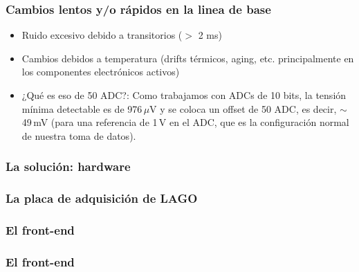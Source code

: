 \documentclass{beamer}
\begin{document}
\begin{frame}
  \frametitle{Cambios lentos y/o rápidos en la linea de base}
    \begin{block}{}
      \begin{itemize}
        \pause
        \item Ruido excesivo debido a transitorios ($>$ 2 ms)
        \pause
        \item Cambios debidos a temperatura (drifts térmicos, aging, etc.
              principalmente en los componentes electrónicos activos)
        \pause
        \item ¿Qué es eso de 50 ADC?: Como trabajamos con ADCs de 10 bits, la
              tensión mínima detectable es de 976\,$\mu$V y se coloca un offset de
              50 ADC, es decir, $\sim$49\,mV (para una referencia de 1\,V en el
              ADC, que es la configuración normal de nuestra toma de datos).
      \end{itemize}
    \end{block}
\end{frame}

\subsubsection{La solución: hardware}

\begin{frame}
  \frametitle{La placa de adquisición de LAGO}
  \begin{block}{}
    \centering
  \end{block}
\end{frame}

\begin{frame}
  \frametitle{El front-end}
  \begin{block}{}
    \centering
  \end{block}
\end{frame}

\begin{frame}
  \frametitle{El front-end}
  \begin{block}{}
    \centering
  \end{block}
\end{frame}
\end{document}

